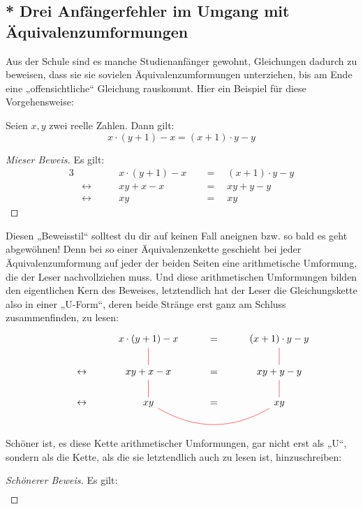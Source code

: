 \subsection*{* Drei Anfängerfehler im Umgang mit Äquivalenzumformungen}


\begin{bem}[„Gleichungs-U's“]
    Aus der Schule sind es manche Studienanfänger gewohnt, Gleichungen dadurch zu beweisen, dass sie sie sovielen Äquivalenzumformungen unterziehen, bis am Ende eine „offensichtliche“ Gleichung rauskommt. Hier ein Beispiel für diese Vorgehensweise:
    \begin{bsp}
    Seien $x,y$ zwei reelle Zahlen. Dann gilt:
        \[ x\cdot (y+1)-x = (x+1)\cdot y-y\]
    \end{bsp}
    \begin{proof}[Mieser Beweis]\let\qed\relax
        Es gilt:
        \begin{alignat*}{3}
            && x\cdot (y+1)-x& \quad=\quad (x+1)\cdot y-y \\
            &\leftrightarrow\qquad& xy + x  -x& \quad=\quad xy + y - y \\
            &\leftrightarrow\qquad& xy & \quad=\quad xy
        \end{alignat*}
    \end{proof}
    Diesen „Beweisstil“ solltest du dir auf keinen Fall aneignen bzw. so bald es geht abgewöhnen! Denn bei so einer Äquivalenzenkette geschieht bei jeder Äquivalenzumformung auf jeder der beiden Seiten eine arithmetische Umformung, die der Leser nachvollziehen muss. Und diese arithmetischen Umformungen bilden den eigentlichen Kern des Beweises, letztendlich hat der Leser die Gleichungskette also in einer „U-Form“, deren beide Stränge erst ganz am Schluss zusammenfinden, zu lesen:
    \[\begin{tikzcd}
        && x\cdot (y+1)-x\ar[red, d, dash] & =& (x+1)\cdot y-y \ar[red, d, dash] \\
        &\leftrightarrow& xy + x-x  \ar[red, d, dash] & =& xy + y - y \ar[red, d, dash] \\
        &\leftrightarrow& xy \ar[red, rr, dash, bend right] & =& xy
    \end{tikzcd}\]
    Schöner ist, es diese Kette arithmetischer Umformungen, gar nicht erst als „U“, sondern als die Kette, als die sie letztendlich auch zu lesen ist, hinzuschreiben:
    \begin{proof}[Schönerer Beweis]
        Es gilt:
        \begin{align*}

\end{align*}
\end{proof}
\end{bem}
